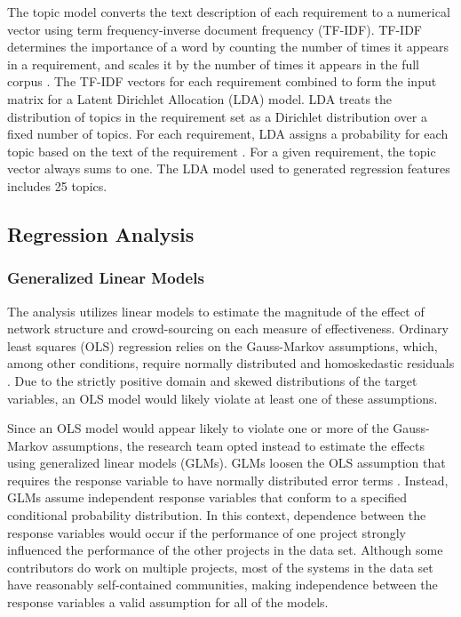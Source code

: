 The topic model converts the text description of each requirement to a numerical vector using term frequency-inverse document frequency (TF-IDF). TF-IDF determines the importance of a word by counting the number of times it appears in a requirement, and scales it by the number of times it appears in the full corpus \cite{aizawa}. The TF-IDF vectors for each requirement combined to form the input matrix for a Latent Dirichlet Allocation (LDA) model. LDA treats the distribution of topics in the requirement set as a Dirichlet distribution over a fixed number of topics. For each requirement, LDA assigns a probability for each topic based on the text of the requirement \cite{blei}. For a given requirement, the topic vector always sums to one. The LDA model used to generated regression features includes 25 topics.

\subsection{Regression Analysis}

\subsubsection{Generalized Linear Models}
\label{glm}

The analysis utilizes linear models to estimate the magnitude of the effect of network structure and crowd-sourcing on each measure of effectiveness. Ordinary least squares (OLS) regression relies on the Gauss-Markov assumptions, which, among other conditions, require normally distributed and homoskedastic residuals \cite{wooldridge}. Due to the strictly positive domain and skewed distributions of the target variables, an OLS model would likely violate at least one of these assumptions.

Since an OLS model would appear likely to violate one or more of the Gauss-Markov assumptions, the research team opted instead to estimate the effects using generalized linear models (GLMs). GLMs loosen the OLS assumption that requires the response variable to have normally distributed error terms \cite{fahrmeir}. Instead, GLMs assume independent response variables that conform to a specified conditional probability distribution. In this context, dependence between the response variables would occur if the performance of one project strongly influenced the performance of the other projects in the data set. Although some contributors do work on multiple projects, most of the systems in the data set have reasonably self-contained communities, making independence between the response variables a valid assumption for all of the models.

